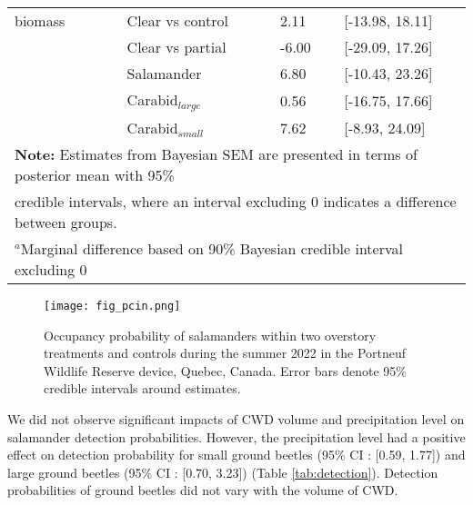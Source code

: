 \begin{table}[h!]
\begin{tabular}{lllll}
      biomass             && Clear vs control  & \hspace{1mm}2.11 & [-13.98, 18.11] \\ 
                          && Clear vs partial  & -6.00 & [-29.09, 17.26] \\  
                          && Salamander        & \hspace{1mm}6.80 & [-10.43, 23.26] \\ 
                          && Carabid$_{large}$      & \hspace{1mm}0.56 & [-16.75, 17.66] \\ 
                          && Carabid$_{small}$      & \hspace{1mm}7.62 & [-8.93, 24.09] \\ 
      \hline
      \multicolumn{5}{l}{\textbf{Note:} Estimates from Bayesian SEM are presented in terms of posterior mean with 95\%} \\
      \multicolumn{5}{l}{credible intervals, where an interval excluding 0 indicates a difference between groups.} \\
      \multicolumn{5}{l}{$^{a}$Marginal difference based on 90\% Bayesian credible interval excluding 0}
  \end{tabular}
\end{table}

\clearpage

\begin{figure}[h!]
  \centering
  \texttt{[image: fig\_pcin.png]}
  \caption[Occupancy probability of salamanders under overstory treatments]
  {Occupancy probability of salamanders within two overstory treatments and controls during the summer 2022 in the Portneuf Wildlife Reserve device, Quebec, Canada. 
  Error bars denote 95\% credible intervals around estimates.}
  \label{fig:pcin}
\end{figure}

\vspace{10pt}

\clearpage

We did not observe significant impacts of CWD volume and precipitation level on salamander detection probabilities. 
However, the precipitation level had a positive effect on detection probability for small ground beetles (95\% CI : [0.59, 1.77]) and large ground beetles (95\% CI : [0.70, 3.23]) (Table \ref{tab:detection}). 
Detection probabilities of ground beetles did not vary with the volume of CWD.

